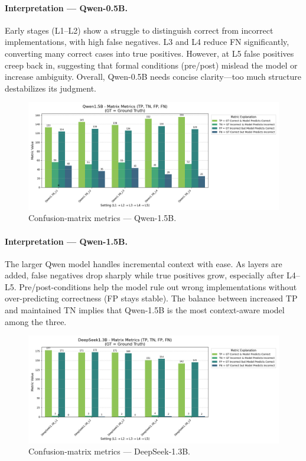 \documentclass[a4paper]{usiinfbachelorproject}
\begin{document}
\paragraph*{Interpretation — Qwen-0.5B.}
Early stages (L1–L2) show a struggle to distinguish correct from incorrect implementations, with high false negatives. L3 and L4 reduce FN significantly, converting many correct cases into true positives. However, at L5 false positives creep back in, suggesting that formal conditions (pre/post) mislead the model or increase ambiguity. Overall, Qwen-0.5B needs concise clarity—too much structure destabilizes its judgment.

\vspace{0.8em}

\begin{figure}[H]\centering
  \includegraphics[width=\linewidth]{figures/Qwen1.5B_matrix_metrics.png}
  \caption{Confusion-matrix metrics — Qwen-1.5B.}
  \label{fig:q15-matrix}
\end{figure}

\paragraph*{Interpretation — Qwen-1.5B.}
The larger Qwen model handles incremental context with ease. As layers are added, false negatives drop sharply while true positives grow, especially after L4–L5. Pre/post-conditions help the model rule out wrong implementations without over-predicting correctness (FP stays stable). The balance between increased TP and maintained TN implies that Qwen-1.5B is the most context-aware model among the three.

\vspace{0.8em}

\begin{figure}[H]\centering
  \includegraphics[width=\linewidth]{figures/DeepSeek1.3B_matrix_metrics.png}
  \caption{Confusion-matrix metrics — DeepSeek-1.3B.}
  \label{fig:ds-matrix}
\end{figure}
\end{document}
